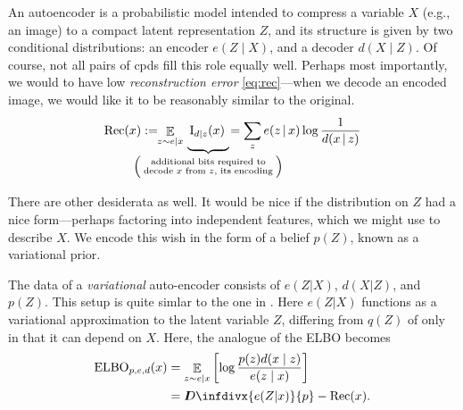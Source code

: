 \documentclass[twoside]{article}
\makeatletter
\theoremstyle{plain}
\theoremstyle{definition}
\DeclareMathOperator*{\Ex}{\mathbb{E}} %
\newcommand{\thickD}{I\mkern-8muD}
\newcommand{\kldiv}{\thickD\infdivx}
\newcommand\aar{\@ifstar\aar@one@star\aar@plain}
\newcommand\aar@one@star{\@ifstar\aar@resize{\aar@plain*}}
\newcommand\aar@resize[1]{\sbox{\aar@content}{#1}\scaleleftright[3.8ex]
		{\Biggl\langle\!\!\!\!\Biggl\langle}{\usebox{\aar@content}}
		{\Biggr\rangle\!\!\!\!\Biggr\rangle}}
\makeatother
\begin{document}
An autoencoder is a probabilistic model intended to compress a variable $X$ (e.g., an image) to a compact latent representation $Z$, and its structure is given  by two conditional distributions:
an encoder $e(Z \mid X)$, and a decoder $d(X \mid Z)$.
Of course, not all pairs of cpds fill this role equally well.
Perhaps most importantly, we would to have low \emph{reconstruction error} \eqref{eq:rec}---when we decode an encoded image, we would like it to be reasonably similar to the original.
\vspace{-0.5em}
\begin{equation}
 \mathrm{Rec}(x) := \!\! \Ex_{z \sim e \mid x} \, \underbrace{\,\mathrm I_{d\mid z}(x)~\vphantom{\bigg|}}_{\mathclap{\left(\;\substack{\text{additional bits required to}\\\text{decode $x$ from $z$, its encoding}}\;\right)}}
	\!= \sum_z e(z \,|\, x) \log \frac1{d(x \,|\, z)}\label{eq:rec}
\end{equation}


There are other desiderata as well. It would be nice if the distribution on $Z$ had a nice form---perhaps factoring into independent features, which we might use to describe $X$. We encode this wish in the form of a belief $p(Z)$, known as a variational prior.

The data of a \emph{variational} auto-encoder consists of $e(Z|X)$, $d(X|Z)$, and $p(Z)$.
This setup is quite simlar to the one in . Here $e(Z|X)$ functions as a variational approximation to the latent variable $Z$, differing from $q(Z)$ of  only in that it can depend on $X$. Here, the analogue of the ELBO becomes
\vspace{-0.5em}
\begin{align*}
	\mathrm{ELBO}_{p,e,d}(x) &= \Ex_{z \sim e|x} \left[\log \frac{p(z) d(x\mid z)}{e(z\mid x)} \right] \\
		&= \kldiv{e(Z|x)}{p} - \mathrm{Rec}(x).
\end{align*}
\end{document}
